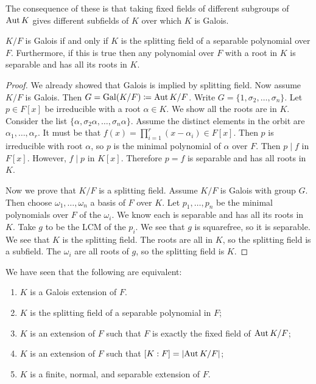 \documentclass[10pt, twoside]{article}
\begin{document}
    The consequence of these is that taking fixed fields of different subgroups
    of $\operatorname{Aut}{K}$ gives different subfields of $K$ over which $K$ is Galois.

    \begin{thm} $K/F$ is Galois if and only if $K$ is the splitting field of a
        separable polynomial over $F$. Furthermore, if this is true then any
        polynomial over $F$ with a root in $K$ is separable and has all its
        roots in $K$.  \begin{proof} We already showed that Galois is implied
            by splitting field. Now assume $K/F$ is Galois. Then $G =
            \mathrm{Gal}(K/F) \coloneqq \operatorname{Aut}{K/F}$. Write $G = \{1, \sigma_2,
            \ldots, \sigma_n\}$. Let $p \in F[x]$ be irreducible with a root
            $\alpha \in K$. We show all the roots are in $K$. Consider the list
            $\{\alpha, \sigma_2 \alpha, \ldots, \sigma_n \alpha\}$. Assume the
            distinct elements in the orbit are $\alpha_1, \ldots, \alpha_r$. It
            must be that $f(x) = \prod_{i=1}^r (x-\alpha_i) \in F[x]$. Then $p$
            is irreducible with root $\alpha$, so $p$ is the minimal polynomial
            of $\alpha$ over $F$. Then $p \mid f$ in $F[x]$. However, $f \mid
            p$ in $K[x]$. Therefore $p = f$ is separable and has all roots in
            $K$.

            Now we prove that $K/F$ is a splitting field. Assume $K/F$ is
        Galois with group $G$. Then choose $\omega_1, \ldots, \omega_n$ a basis
    of $F$ over $K$. Let $p_1, \ldots, p_n$ be the minimal polynomials over $F$
of the $\omega_i$. We know each is separable and has all its roots in $K$. Take
$g$ to be the $\mathrm{LCM}$ of the $p_i$. We see that $g$ is squarefree, so it
is separable. We see that $K$ is the splitting field. The roots are all in $K$,
so the splitting field is a subfield. The $\omega_i$ are all roots of $g$, so
the splitting field is $K$.  \end{proof} \end{thm}

    We have seen that the following are equivalent: \begin{enumerate} \item $K$
        is a Galois extension of $F$.  \item $K$ is the splitting field of a
        separable polynomial in $F$; \item $K$ is an extension of $F$ such that
        $F$ is exactly the fixed field of $\operatorname{Aut}{K/F}$; \item $K$ is an
extension of $F$ such that $[K:F] = \lvert\operatorname{Aut}{K/F}\rvert$; \item $K$ is a finite,
normal, and separable extension of $F$.  \end{enumerate}
\end{document}
